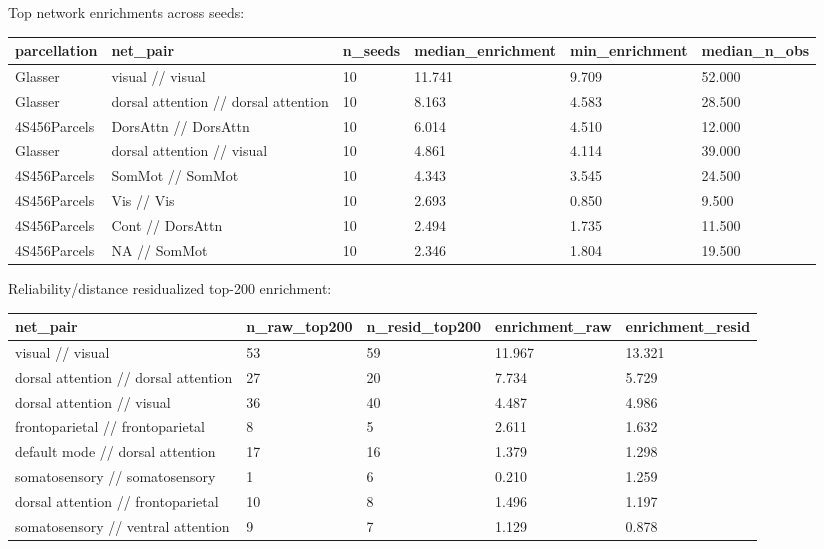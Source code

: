 Top network enrichments across seeds:

{\def\LTcaptype{none} %
\begin{longtable}[]{@{}llllll@{}}
\toprule\noalign{}
parcellation & net\_pair & n\_seeds & median\_enrichment & min\_enrichment & median\_n\_obs \\
\midrule\noalign{}
\endhead
\bottomrule\noalign{}
\endlastfoot
Glasser & visual // visual & 10 & 11.741 & 9.709 & 52.000 \\
Glasser & dorsal attention // dorsal attention & 10 & 8.163 & 4.583 & 28.500 \\
4S456Parcels & DorsAttn // DorsAttn & 10 & 6.014 & 4.510 & 12.000 \\
Glasser & dorsal attention // visual & 10 & 4.861 & 4.114 & 39.000 \\
4S456Parcels & SomMot // SomMot & 10 & 4.343 & 3.545 & 24.500 \\
4S456Parcels & Vis // Vis & 10 & 2.693 & 0.850 & 9.500 \\
4S456Parcels & Cont // DorsAttn & 10 & 2.494 & 1.735 & 11.500 \\
4S456Parcels & NA // SomMot & 10 & 2.346 & 1.804 & 19.500 \\
\end{longtable}
}

Reliability/distance residualized top-200 enrichment:

{\def\LTcaptype{none} %
\begin{longtable}[]{@{}lllll@{}}
\toprule\noalign{}
net\_pair & n\_raw\_top200 & n\_resid\_top200 & enrichment\_raw & enrichment\_resid \\
\midrule\noalign{}
\endhead
\bottomrule\noalign{}
\endlastfoot
visual // visual & 53 & 59 & 11.967 & 13.321 \\
dorsal attention // dorsal attention & 27 & 20 & 7.734 & 5.729 \\
dorsal attention // visual & 36 & 40 & 4.487 & 4.986 \\
frontoparietal // frontoparietal & 8 & 5 & 2.611 & 1.632 \\
default mode // dorsal attention & 17 & 16 & 1.379 & 1.298 \\
somatosensory // somatosensory & 1 & 6 & 0.210 & 1.259 \\
dorsal attention // frontoparietal & 10 & 8 & 1.496 & 1.197 \\
somatosensory // ventral attention & 9 & 7 & 1.129 & 0.878 \\
\end{longtable}
}

